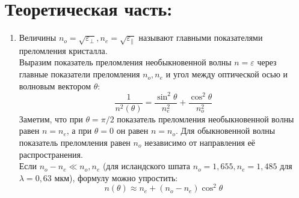 \section*{Теоретическая часть:}
\begin{enumerate}
    \item Величины $n_o = \sqrt{\varepsilon_{\bot}}, n_e = \sqrt{\varepsilon_{\|}}$ называют главными показателями
преломления кристалла. \\
Выразим показатель преломления необыкновенной волны $n = \varepsilon$ через главные показатели преломления $n_o , n_e$ и угол между оптической осью и волновым вектором $\theta$:
\[ \frac{1}{n^2(\theta)} = \frac{\sin^2{\theta}}{n^2_e} + \frac{\cos^2{\theta}}{n^2_o} \]
Заметим, что при $\theta = \pi/2$ показатель преломления необыкновенной волны равен $n = n_e$, а при $\theta = 0$ он равен $n = n_o$. Для обыкновенной волны показатель преломления равен $n_o$ независимо от направления её распространения. \\
Если $n_o − n_e \ll n_o, n_e$ (для исландского шпата $n_o = 1,655, n_e = 1,485$
для $\lambda = 0,63$ мкм), формулу можно упростить:
\[ n(\theta) \approx n_e + (n_o - n_e) \cos^2{\theta}\]


\end{enumerate}
